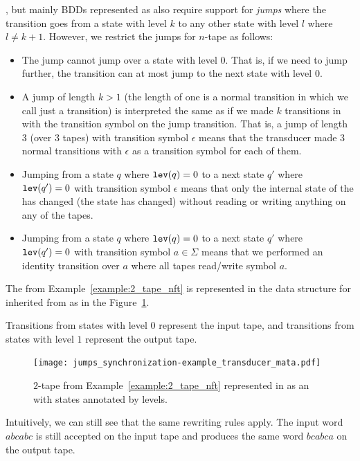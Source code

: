 \nfts, but mainly BDDs represented as \nfaClass also require support for \emph{jumps} where the transition goes from a state with level $k$ to any other state with level $l$ where $l \neq k + 1$.
However, we restrict the jumps for $n$-tape \nft as follows:
\begin{itemize}
  \item The jump cannot jump over a state with level $0$.
  That is, if we need to jump further, the transition can at most jump to the next state with level $0$.
  \item A jump of length $k > 1$ (the length of one is a normal transition in \nfaClass which we call just a transition) is interpreted the same as if we made $k$ transitions in \nfaClass with the transition symbol on the jump transition.
  That is, a jump of length $3$ (over $3$ tapes) with transition symbol $\epsilon$ means that the transducer made $3$ normal transitions with $\epsilon$ as a transition symbol for each of them.
  \item Jumping from a state $q$ where $\texttt{lev}(q) = 0$ to a next state $q'$ where $\texttt{lev}(q') = 0$ with transition symbol $\epsilon$ means that only the internal state of the \nft has changed (the state has changed) without reading or writing anything on any of the tapes.
  \item Jumping from a state $q$ where $\texttt{lev}(q) = 0$ to a next state $q'$ where $\texttt{lev}(q') = 0$ with transition symbol $a \in \Sigma$ means that we performed an identity \nft transition over $a$ where all tapes read/write symbol $a$.
\end{itemize}





\begin{example}\label{example:2_tape_nft_in_mata}
  The \nft from Example~\ref{example:2_tape_nft} is represented in the data structure for \nfts inherited from \nfaClass as in the Figure~\ref{fig:2_tape_nft_in_mata}.

  Transitions from states with level $0$ represent the input tape, and transitions from states with level $1$ represent the output tape.

  \begin{figure}[ht]
    \centering
    \texttt{[image: jumps\_synchronization-example\_transducer\_mata.pdf]}
    \caption{
      $2$-tape \nft from Example~\ref{example:2_tape_nft} represented in \mata as an \nfaClass with states annotated by levels.
    }\label{fig:2_tape_nft_in_mata}
  \end{figure}

Intuitively, we can still see that the same rewriting rules apply.
The input word $abcabc$ is still accepted on the input tape and produces the same word $bcabca$ on the output tape.

\end{example}

